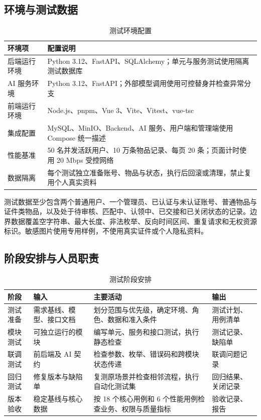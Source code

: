 \subsection{环境与测试数据}

\begin{table}[H]
  \centering
  \caption{测试环境配置}
  \begin{tabularx}{\textwidth}{L{3.1cm}Y}
    \toprule
    环境项 & 配置说明 \\
    \midrule
    后端运行环境 & Python 3.12、FastAPI、SQLAlchemy；单元与服务测试使用隔离测试数据库 \\
    AI 服务环境 & Python 3.12、FastAPI；外部模型调用使用可控替身并检查异常分支 \\
    前端运行环境 & Node.js、pnpm、Vue 3、Vite、Vitest、vue-tsc \\
    集成配置 & MySQL、MinIO、Backend、AI 服务、用户端和管理端使用 Compose 统一描述 \\
    性能基准 & 50 名并发活跃用户、10 万条物品记录、每页 20 条；页面计时使用 20 Mbps 受控网络 \\
    数据隔离 & 每个测试独立准备账号、物品与状态，执行后回滚或清理，禁止复用个人真实资料 \\
    \bottomrule
  \end{tabularx}
\end{table}

测试数据至少包含两个普通用户、一个管理员、已认证与未认证账号、普通物品与证件类物品，以及处于待审核、匹配中、认领中、已交接和已关闭状态的记录。边界数据覆盖空字符串、最大长度、非法枚举、反向时间区间、重复请求和无权资源标识。敏感图片使用专用样例，不使用真实证件或个人隐私资料。

\subsection{阶段安排与人员职责}

\begin{table}[H]
  \centering
  \caption{测试阶段安排}
  \begin{tabularx}{\textwidth}{L{2.2cm}L{3.4cm}Y L{3.1cm}}
    \toprule
    阶段 & 输入 & 主要活动 & 输出 \\
    \midrule
    测试准备 & 需求基线、模型、接口文档 & 划分范围与优先级，确定环境、角色、数据和准入条件 & 测试计划、用例清单 \\
    模块测试 & 可独立运行的模块 & 编写单元、服务和接口测试，执行静态检查 & 测试记录、缺陷单 \\
    联调测试 & 前后端及 AI 契约 & 检查参数、枚举、错误码和跨模块状态传递 & 联调问题记录 \\
    回归测试 & 修复版本与缺陷单 & 复测原场景并检查相邻流程，执行自动化测试集 & 回归结果、关闭记录 \\
    版本验收 & 稳定基线与核心数据 & 按 18 个核心用例和 6 个性能用例检查业务、权限与质量指标 & 验收记录、报告 \\
    \bottomrule
  \end{tabularx}
\end{table}

